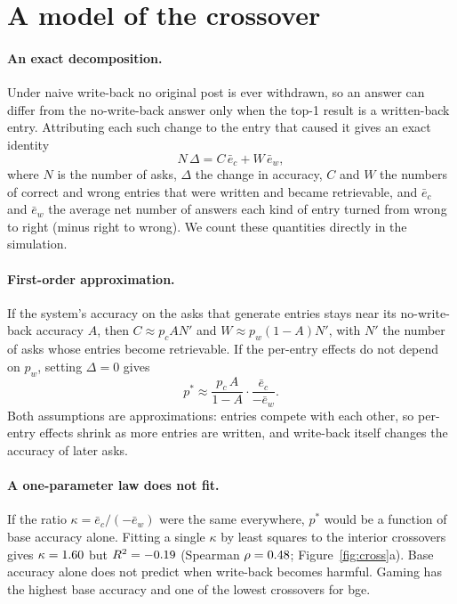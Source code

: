 \documentclass[11pt]{article}
\begin{document}
\section{A model of the crossover}
\label{sec:model}
\paragraph{An exact decomposition.} Under naive write-back no original post is ever withdrawn, so an answer can differ from the no-write-back answer only when the top-1 result is a written-back entry. Attributing each such change to the entry that caused it gives an exact identity
\begin{equation}
N\,\Delta = C\,\bar e_c + W\,\bar e_w,
\label{eq:decomp}
\end{equation}
where $N$ is the number of asks, $\Delta$ the change in accuracy, $C$ and $W$ the numbers of correct and wrong entries that were written and became retrievable, and $\bar e_c$ and $\bar e_w$ the average net number of answers each kind of entry turned from wrong to right (minus right to wrong). We count these quantities directly in the simulation.

\paragraph{First-order approximation.} If the system's accuracy on the asks that generate entries stays near its no-write-back accuracy $A$, then $C\approx p_c A N'$ and $W\approx p_w(1-A)N'$, with $N'$ the number of asks whose entries become retrievable. If the per-entry effects do not depend on $p_w$, setting $\Delta=0$ gives
\begin{equation}
p^* \approx \frac{p_c\,A}{1-A}\cdot\frac{\bar e_c}{-\bar e_w}.
\label{eq:pstar}
\end{equation}
Both assumptions are approximations: entries compete with each other, so per-entry effects shrink as more entries are written, and write-back itself changes the accuracy of later asks.

\paragraph{A one-parameter law does not fit.} If the ratio $\kappa=\bar e_c/(-\bar e_w)$ were the same everywhere, $p^*$ would be a function of base accuracy alone. Fitting a single $\kappa$ by least squares to the \nOne{} interior crossovers gives $\kappa=1.60$ but $R^2=-0.19$ (Spearman $\rho=0.48$; Figure~\ref{fig:cross}a). Base accuracy alone does not predict when write-back becomes harmful. Gaming has the highest base accuracy and one of the lowest crossovers for bge.
\end{document}

